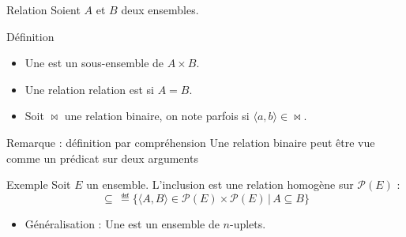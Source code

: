 
\begingroup

\begin{frame}{Relation}
  Soient $A$ et $B$ deux ensembles. 
  \begin{block}{Définition}
    \begin{itemize}
    \item Une  est un \alert{sous-ensemble de $A \times B$}. 
    \item Une relation relation est  si $A = B$. 
    \item Soit $\bowtie$ une relation binaire, on note parfois  si \alert{$\langle a, b \rangle \in \bowtie$}. 
    \end{itemize}
  \end{block}
  \begin{block}{Remarque : définition par compréhension}
    Une relation binaire peut être vue comme un prédicat sur deux arguments
  \end{block}
  
  \begin{exampleblock}{Exemple}
    Soit $E$ un ensemble. L'inclusion est une relation homogène sur $\mathscr{P}(E)$ : 
    $$\subseteq \,\eqdef \{\langle A, B \rangle \in \mathscr{P}(E) \times \mathscr{P}(E) \,|\, A \subseteq B \}$$ 
  \end{exampleblock}

  \vspace{-2mm}
  \begin{itemize}
  \item Généralisation : Une  est un \alert{ensemble de $n$-uplets}.
  \end{itemize}
\end{frame}


\endgroup
